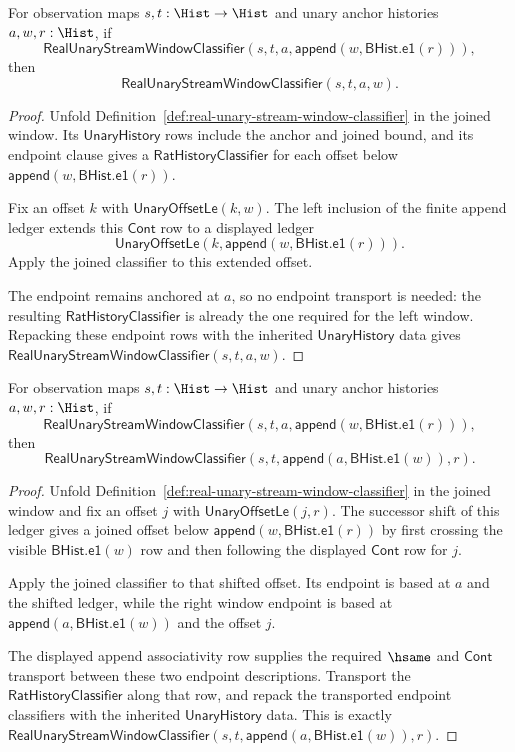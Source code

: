 \begin{theorem}
\label{thm:real-unary-window-concat-left-projection}
For observation maps $s,t:\Hist\to\Hist$ and unary anchor histories
$a,w,r:\Hist$, if
$$
\mathsf{RealUnaryStreamWindowClassifier}
(s,t,a,\mathsf{append}(w,\mathsf{BHist.e1}(r))),
$$
then
$$
\mathsf{RealUnaryStreamWindowClassifier}(s,t,a,w).
$$
\end{theorem}
\begin{proof}
Unfold Definition~\ref{def:real-unary-stream-window-classifier} in the joined
window. Its $\mathsf{UnaryHistory}$ rows include the anchor and joined bound,
and its endpoint clause gives a $\mathsf{RatHistoryClassifier}$ for each
offset below $\mathsf{append}(w,\mathsf{BHist.e1}(r))$.

Fix an offset $k$ with $\mathsf{UnaryOffsetLe}(k,w)$. The left inclusion of
the finite append ledger extends this $\mathsf{Cont}$ row to a displayed
ledger
$$
\mathsf{UnaryOffsetLe}(k,\mathsf{append}(w,\mathsf{BHist.e1}(r))).
$$
Apply the joined classifier to this extended offset.

The endpoint remains anchored at $a$, so no endpoint transport is needed:
the resulting $\mathsf{RatHistoryClassifier}$ is already the one required for
the left window. Repacking these endpoint rows with the inherited
$\mathsf{UnaryHistory}$ data gives
$\mathsf{RealUnaryStreamWindowClassifier}(s,t,a,w)$.
\end{proof}

\begin{theorem}
\label{thm:real-unary-window-concat-right-projection}
For observation maps $s,t:\Hist\to\Hist$ and unary anchor histories
$a,w,r:\Hist$, if
$$
\mathsf{RealUnaryStreamWindowClassifier}
(s,t,a,\mathsf{append}(w,\mathsf{BHist.e1}(r))),
$$
then
$$
\mathsf{RealUnaryStreamWindowClassifier}
(s,t,\mathsf{append}(a,\mathsf{BHist.e1}(w)),r).
$$
\end{theorem}
\begin{proof}
Unfold Definition~\ref{def:real-unary-stream-window-classifier} in the joined
window and fix an offset $j$ with $\mathsf{UnaryOffsetLe}(j,r)$. The successor
shift of this ledger gives a joined offset below
$\mathsf{append}(w,\mathsf{BHist.e1}(r))$ by first crossing the visible
$\mathsf{BHist.e1}(w)$ row and then following the displayed $\mathsf{Cont}$
row for $j$.

Apply the joined classifier to that shifted offset. Its endpoint is based at
$a$ and the shifted ledger, while the right window endpoint is based at
$\mathsf{append}(a,\mathsf{BHist.e1}(w))$ and the offset $j$.

The displayed append associativity row supplies the required $\hsame$ and
$\mathsf{Cont}$ transport between these two endpoint descriptions. Transport
the $\mathsf{RatHistoryClassifier}$ along that row, and repack the transported
endpoint classifiers with the inherited $\mathsf{UnaryHistory}$ data. This is
exactly
$\mathsf{RealUnaryStreamWindowClassifier}
(s,t,\mathsf{append}(a,\mathsf{BHist.e1}(w)),r)$.
\end{proof}

